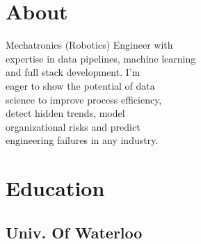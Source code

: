 \documentclass[]{deedy-resume-openfont}
\begin{document}
%
%

%
%



%
%

\begin{minipage}[t]{0.33\textwidth}


\section{About}
Mechatronics (Robotics) Engineer with \\
expertise in data pipelines, machine learning \\
and full stack development. I'm \\
eager to show the potential of data \\
science to improve process efficiency,\\
detect hidden trends, model \\
organizational risks and predict \\
engineering failures in any industry.


\section{Education}

\subsection{Univ. Of Waterloo}
\sectionsep




\end{minipage}
\end{document}
